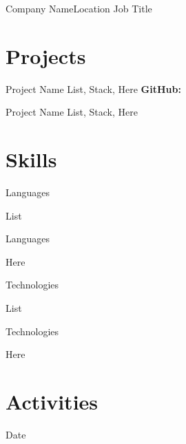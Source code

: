 \documentclass[11pt]{resume}
\begin{document}
\begin{experience}{Company Name}{Location}
    {Job Title}
    {}
    \item \lipsum[1][16-17]
    \item \lipsum[2][1-3]
    \item \lipsum[2][4]
\end{experience}




\section{Projects}

\begin{project}{Project Name}
    {List, Stack, Here}
    {\textbf{GitHub:} }
    \item \lipsum[2][5-9]
    \item \lipsum[2][10-12]
\end{project}

\begin{project}{Project Name}
    {List, Stack, Here}
    {}
    \item \lipsum[3][1-2]
    \item \lipsum[3][3-8]
\end{project}




\section{Skills}

\begin{skills}{Languages}
    \item List
    \item Languages
    \item Here
\end{skills}

\begin{skills}{Technologies}
    \item List
    \item Technologies
    \item Here
\end{skills}




\section{Activities}

{}

{Date}

{}
\end{document}
